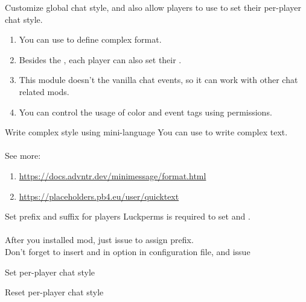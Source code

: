 Customize global chat style, and also allow players to use  to set their per-player chat style.

\begin{enumerate}
    \item You can use  to define complex format.
    \item Besides the , each player can also set their .
    \item This module doesn't  the vanilla chat events, so it can work with other chat related mods.
    \item You can control the usage of color and event tags using permissions.
\end{enumerate}

\begin{tips}{Write complex style using mini-language}
    You can use  to write complex text.\\
    \\
    See more:
    \begin{enumerate}
        \item \url{https://docs.advntr.dev/minimessage/format.html}
        \item \url{https://placeholders.pb4.eu/user/quicktext}
    \end{enumerate}
\end{tips}


\begin{example}{Set prefix and suffix for players}
    Luckperms is required to set  and . \\
    \\
    After you installed  mod, just issue  to assign prefix. \\
    Don't forget to insert  and  in  option in configuration file, and issue 
\end{example}

\begin{example}{Set per-player chat style}
\end{example}

\begin{example}{Reset per-player chat style}
\end{example}

